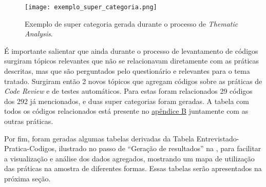 \begin{figure}[ht]
\begin{center}
\texttt{[image: exemplo\_super\_categoria.png]}
\end{center}
\caption[Exemplo de super categoria]{
    Exemplo de super categoria gerada durante o processo de \emph{Thematic Analysis}.
}\label{exemplo_super_categoria}
\end{figure}

É importante salientar que ainda durante o processo de levantamento de códigos surgiram tópicos relevantes que não se relacionavam diretamente com as práticas descritas, mas que são perguntados pelo questionário e relevantes para o tema tratado. Surgiram então 2 novos tópicos que agregam códigos sobre as práticas de \emph{Code Review} e de testes automáticos. Para estas foram relacionados 29 códigos dos 292 já mencionados, e duas super categorias foram geradas. A tabela com todos os códigos relacionados está presente no \hyperlink{tabela1}{apêndice B} juntamente com as outras práticas.

Por fim, foram geradas algumas tabelas derivadas da Tabela Entrevistado-Pratica-Codigos, ilustrado no passo de ``Geração de resultados'' na , para facilitar a visualização e análise dos dados agregados, mostrando um mapa de utilização das práticas na amostra de diferentes formas. Essas tabelas serão apresentados na próxima seção.

